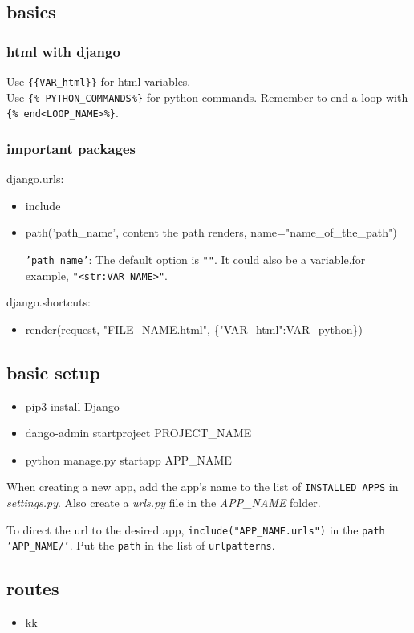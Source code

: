 \documentclass[12pt,a4paper]{article}
\newcommand{\hN}{\_NAME}
\begin{document}
\subsection{basics}
	\subsubsection{html with django}
	Use \texttt{\{\{VAR\_html\}\}} for html variables.\\
	Use \texttt{\{\% PYTHON\_COMMANDS\%\}} for python commands. Remember to end a loop with \texttt{\{\% end<LOOP\_NAME>\%\}}.
	\subsubsection{important packages}
	\ttfamily
	django.urls:
	\begin{itemize}
		\item include
		\item path('path\_name', content the path renders, name="name\_of\_the\_path")
		
		\textnormal{
		\texttt{'path\_name'}:
		The default option is \texttt{""}. It could also be a variable,for example, \texttt{"<str:VAR\_NAME>"}.
		}
	\end{itemize}
	django.shortcuts:
	\begin{itemize}
		\item render(request, "FILE\_NAME.html", \{"VAR\_html":VAR\_python\})
	\end{itemize}
	\subsection{basic setup}
	\begin{itemize}
	\ttfamily
		\item pip3 install Django
		\item dango-admin startproject PROJECT\hN
		\item python manage.py startapp APP\hN
	\end{itemize}
	\normalfont
	When creating a new app, add the app's name to the list of \texttt{INSTALLED\_APPS} in \textit{settings.py}. Also create a \textit{urls.py} file in the \textit{APP\hN} folder.
	
	To direct the url to the desired app, \texttt{include("APP\hN.urls")} in the \texttt{path 'APP\hN/'}. Put the \texttt{path} in the list of \texttt{urlpatterns}.		
	\subsection{routes}
		\begin{itemize}
		\item kk
	\end{itemize}
\end{document}
